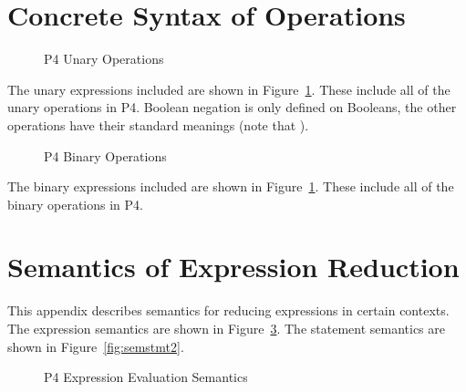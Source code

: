 \documentclass[UTF8]{article}
\begin{document}
\printbibliography

\clearpage
\appendix
\section{Concrete Syntax of Operations}
\label{app:op}
\begin{figure}[ht!]
\centering\ottgrammartabular{
\ottunop\ottafterlastrule
}
\caption{P4 Unary Operations}
\label{fig:unop}
\end{figure}

The unary expressions included are shown in Figure~\ref{fig:unop}. These include all of the unary operations in P4. Boolean negation is only defined on Booleans, the other operations have their standard meanings (note that ).

\newpage
\begin{figure}[ht!]
\centering\ottgrammartabular{
\ottbinop\ottafterlastrule
}
\caption{P4 Binary Operations}
\label{fig:binop}
\end{figure}

The binary expressions included are shown in Figure~\ref{fig:unop}. These include all of the binary operations in P4.

\section{Semantics of Expression Reduction}
\label{app:exp}
This appendix describes semantics for reducing expressions in certain contexts. The expression semantics are shown in Figure~\ref{fig:semexp2}. The statement semantics are shown in Figure~\ref{fig:semstmt2}.

\begin{figure}[ht!]
\caption{P4 Expression Evaluation Semantics}
\label{fig:semexp2}
\end{figure}
\end{document}
